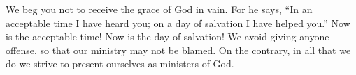 \lettrine[lines=3]{W}{}e beg you not to receive the grace of God in vain. For he says, “In an acceptable time I have heard you; on a day of salvation I have helped you.” Now is the acceptable time! Now is the day of salvation! We avoid giving anyone offense, so that our ministry may not be blamed. On the contrary, in all that we do we strive to present ourselves as ministers of God.
